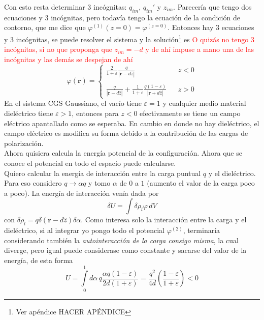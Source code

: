 Con esto resta determinar 3 incógnitas: $q_{im}$, $q_{im}'$ y $z_{im}$. Parecería que tengo dos ecuaciones y 3 incógnitas, pero todavía tengo la ecuación de la condición de contorno, que me dice que $\varphi^{(1)}(z = 0) = \varphi^{(z = 0)}$. Entonces hay 3 ecuaciones y 3 incógnitas, se puede resolver el sistema y la solución\footnote{Ver apéndice HACER APÉNDICE} es
\textcolor{red}{O quizás no tengo 3 incógnitas, si no que proponga que $z_{im} = -d$ y de ahí impuse a mano una de las incógnitas y las demás se despejan de ahí}
\begin{equation*}
    \varphi(\textbf{r}) = 
    \left\{
        \begin{matrix}
            \frac{2}{1+\varepsilon}
            \frac{q}{|\textbf{r} - d\hat{z}|}
            & & z < 0\\
            & & \\
            \frac{q}{|\textbf{r}-d\hat{z}|} + \frac{1}{1+\varepsilon}\frac{q(1-\varepsilon)}{|\textbf{r}+d\hat{z}|} 
            & & z > 0
        \end{matrix}
    \right.
\end{equation*}
En el sistema CGS Gaussiano, el vacío tiene $\varepsilon = 1$ y cualquier medio material dieléctrico tiene $\varepsilon > 1$, entonces para $z<0$ efectivamente se tiene un campo eléctrico apantallado como se esperaba. En cambio en donde no hay dieléctrico, el campo eléctrico es modifica su forma debido a la contribución de las cargas de polarización.\\
\indent Ahora quisiera calcula la energía potencial de la configuración. Ahora que se conoce el potencial en todo el espacio puede calcularse.\\
\indent Quiero calcular la energía de interacción entre la carga puntual $q$ y el dieléctrico. Para eso considero $q \to \alpha q$ y tomo $\alpha$ de $0$ a $1$ (aumento el valor de la carga poco a poco). La energía de interacción venía dada por
\begin{equation*}
    \delta U = \int \delta \rho_{l} \varphi\,dV
\end{equation*}
con $\delta \rho_{l} = q \delta(\textbf{r}-d\hat{z})\delta \alpha$. Como interesa solo la interacción entre la carga y el dieléctrico, si al integrar yo pongo todo el potencial $\varphi^{(2)}$, terminaría considerando también la \textit{autointeracción de la carga consigo misma}, la cual diverge, pero igual puede considerase como constante y sacarse del valor de la energía, de esta forma
\begin{equation*}
    U = \int\limits_{0}^{1} d\alpha\,q
    \frac{\alpha q(1-\varepsilon)}{2d(1+\varepsilon)} 
    = \frac{q^{2}}{4d}
    \left(
        \frac{1-\varepsilon}{1+\varepsilon}
    \right)< 0
\end{equation*}
